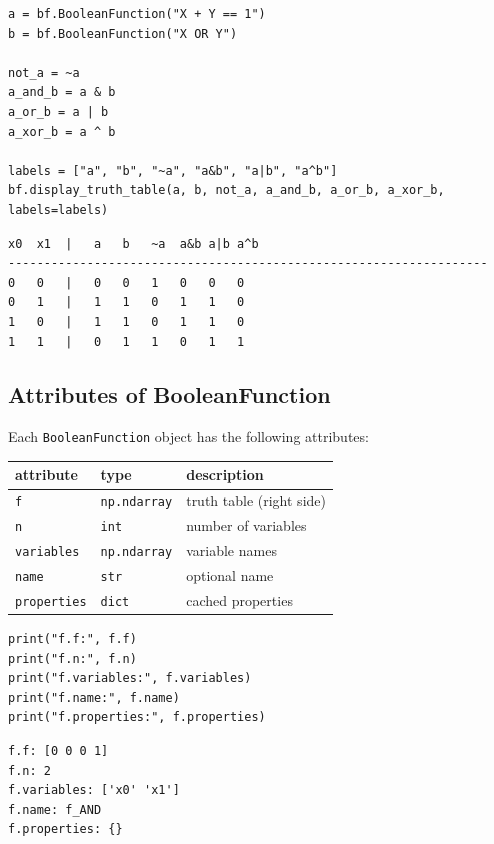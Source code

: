 \documentclass[
]{article}
\newcounter{none} %
\begin{document}
\begin{lstlisting}
a = bf.BooleanFunction("X + Y == 1")
b = bf.BooleanFunction("X OR Y")

not_a = ~a
a_and_b = a & b
a_or_b = a | b
a_xor_b = a ^ b

labels = ["a", "b", "~a", "a&b", "a|b", "a^b"]
bf.display_truth_table(a, b, not_a, a_and_b, a_or_b, a_xor_b, labels=labels)
\end{lstlisting}

\begin{lstlisting}
x0  x1  |   a   b   ~a  a&b a|b a^b
-------------------------------------------------------------------
0   0   |   0   0   1   0   0   0
0   1   |   1   1   0   1   1   0
1   0   |   1   1   0   1   1   0
1   1   |   0   1   1   0   1   1
\end{lstlisting}

\subsection{Attributes of
BooleanFunction}\label{attributes-of-booleanfunction}

Each \texttt{BooleanFunction} object has the following attributes:

{\def\LTcaptype{none} %
\begin{longtable}[]{@{}lll@{}}
\toprule\noalign{}
attribute & type & description \\
\midrule\noalign{}
\endhead
\bottomrule\noalign{}
\endlastfoot
\texttt{f} & \texttt{np.ndarray} & truth table (right side) \\
\texttt{n} & \texttt{int} & number of variables \\
\texttt{variables} & \texttt{np.ndarray} & variable names \\
\texttt{name} & \texttt{str} & optional name \\
\texttt{properties} & \texttt{dict} & cached properties \\
\end{longtable}
}

\begin{lstlisting}
print("f.f:", f.f)
print("f.n:", f.n)
print("f.variables:", f.variables)
print("f.name:", f.name)
print("f.properties:", f.properties)
\end{lstlisting}

\begin{lstlisting}
f.f: [0 0 0 1]
f.n: 2
f.variables: ['x0' 'x1']
f.name: f_AND
f.properties: {}
\end{lstlisting}
\end{document}
